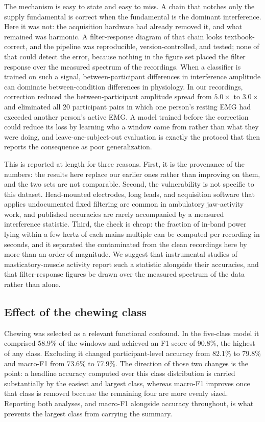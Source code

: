\documentclass[pdflatex,sn-nature,iicol]{sn-jnl}
\begin{document}
The mechanism is easy to state and easy to miss. A chain that notches only the supply fundamental is correct when the fundamental is the dominant interference. Here it was not: the acquisition hardware had already removed it, and what remained was harmonic. A filter-response diagram of that chain looks textbook-correct, and the pipeline was reproducible, version-controlled, and tested; none of that could detect the error, because nothing in the figure set placed the filter response over the measured spectrum of the recordings. When a classifier is trained on such a signal, between-participant differences in interference amplitude can dominate between-condition differences in physiology. In our recordings, correction reduced the between-participant amplitude spread from $5.0\times$ to $3.0\times$ and eliminated all 20 participant pairs in which one person's resting EMG had exceeded another person's active EMG. A model trained before the correction could reduce its loss by learning who a window came from rather than what they were doing, and leave-one-subject-out evaluation is exactly the protocol that then reports the consequence as poor generalization.

This is reported at length for three reasons. First, it is the provenance of the numbers: the results here replace our earlier ones rather than improving on them, and the two sets are not comparable. Second, the vulnerability is not specific to this dataset. Head-mounted electrodes, long leads, and acquisition software that applies undocumented fixed filtering are common in ambulatory jaw-activity work, and published accuracies are rarely accompanied by a measured interference statistic. Third, the check is cheap: the fraction of in-band power lying within a few hertz of each mains multiple can be computed per recording in seconds, and it separated the contaminated from the clean recordings here by more than an order of magnitude. We suggest that instrumental studies of masticatory-muscle activity report such a statistic alongside their accuracies, and that filter-response figures be drawn over the measured spectrum of the data rather than alone.

\subsection{Effect of the chewing class}

Chewing was selected as a relevant functional confound. In the five-class model it comprised 58.9\% of the windows and achieved an F1 score of 90.8\%, the highest of any class. Excluding it changed participant-level accuracy from 82.1\% to 79.8\% and macro-F1 from 73.6\% to 77.9\%. The direction of those two changes is the point: a headline accuracy computed over this class distribution is carried substantially by the easiest and largest class, whereas macro-F1 improves once that class is removed because the remaining four are more evenly sized. Reporting both analyses, and macro-F1 alongside accuracy throughout, is what prevents the largest class from carrying the summary.
\end{document}
